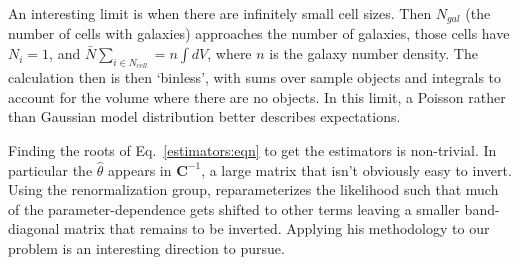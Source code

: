 \documentclass{article}
\begin{document}
An interesting limit is when there are infinitely small cell sizes.  Then $N_{gal}$ (the number of cells with galaxies) approaches the number
of galaxies, those cells have $N_i=1$,  and $\bar{N}\sum_{i\in N_{cell}} = n \int dV$, where $n$ is the galaxy number density.
The calculation then is then `binless', with sums over sample objects and integrals to account for the volume where there are no objects.
In this limit, a Poisson rather than Gaussian model distribution better describes expectations. 

Finding the roots of Eq.~\ref{estimators:eqn} to get the estimators is non-trivial.  In particular the $\hat{\theta}$ appears in $\mathbf{C}^{-1}$, a large matrix that
isn't obviously easy to invert.  Using the renormalization group, \cite{2019PhRvD..99d3538M} reparameterizes the likelihood such that much of the parameter-dependence
gets shifted to other terms leaving a smaller
band-diagonal matrix that remains to be inverted.  Applying his methodology to our problem is an interesting direction to pursue.
\end{document}
